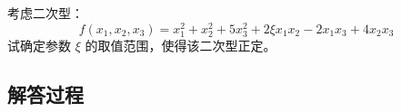 \begin{example}[二次型正定性判定]
    考虑二次型：
    \[
    f(x_1, x_2, x_3) = x_1^2 + x_2^2 + 5x_3^2 + 2\xi x_1x_2 - 2x_1x_3 + 4x_2x_3
    \]
    试确定参数 \(\xi\) 的取值范围，使得该二次型正定。
    \end{example}
    
    \subsection*{解答过程}
    